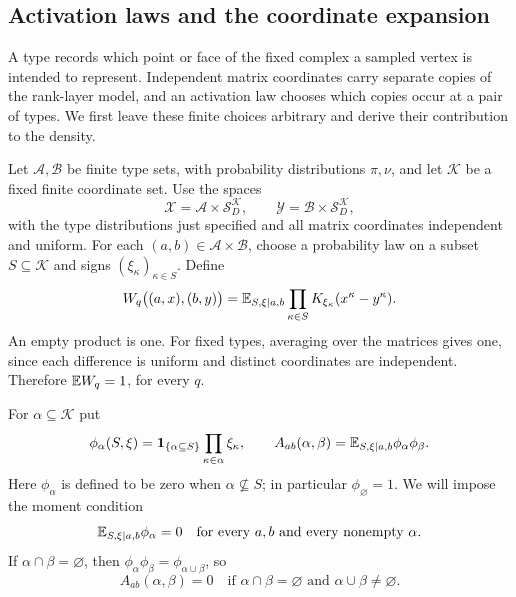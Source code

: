 \subsection{Activation laws and the coordinate expansion}

A type records which point or face of the fixed complex a sampled
vertex is intended to represent. Independent matrix coordinates carry
separate copies of the rank-layer model, and an activation law chooses
which copies occur at a pair of types. We first leave these finite
choices arbitrary and derive their contribution to the density.

Let $\mathcal A,\mathcal B$ be finite type sets, with probability
distributions $\pi,\nu$, and let $\mathcal K$ be a fixed finite
coordinate set. Use the spaces
\[
 \mathcal X=\mathcal A\times\mathcal S_D^{\mathcal K},\qquad
 \mathcal Y=\mathcal B\times\mathcal S_D^{\mathcal K},
\]
with the type distributions just specified and all matrix coordinates
independent and uniform. For each $(a,b)\in\mathcal A\times\mathcal B$,
choose a probability law on a subset $S\subseteq\mathcal K$ and signs
$(\xi_\kappa)_{\kappa\in S}$. Define
\begin{equation}
 W_q\bigl((a,x),(b,y)\bigr)
 =\mathbb E_{S,\xi\mid a,b}\prod_{\kappa\in S}
 K_{\xi_\kappa}(x^\kappa-y^\kappa).
 \label{eq:kernel-activation}
\end{equation}
An empty product is one. For fixed types, averaging over the matrices
gives one, since each difference is uniform and distinct coordinates
are independent. Therefore $\mathbb E W_q=1$, for every $q$.

For $\alpha\subseteq\mathcal K$ put
\[
 \phi_\alpha(S,\xi)=
 \mathbf 1_{\{\alpha\subseteq S\}}\prod_{\kappa\in\alpha}\xi_\kappa,
 \qquad
 A_{ab}(\alpha,\beta)=\mathbb E_{S,\xi\mid a,b}\phi_\alpha\phi_\beta.
\]
Here $\phi_\alpha$ is defined to be zero when $\alpha\not\subseteq S$;
in particular $\phi_\varnothing=1$. We will impose the moment condition
\begin{equation}
 \mathbb E_{S,\xi\mid a,b}\phi_\alpha=0
 \quad\text{for every $a,b$ and every nonempty $\alpha$.}
 \label{eq:kernel-zero-moments}
\end{equation}
If $\alpha\cap\beta=\varnothing$, then
$\phi_\alpha\phi_\beta=\phi_{\alpha\cup\beta}$, so
\begin{equation}
 A_{ab}(\alpha,\beta)=0
 \quad\text{if $\alpha\cap\beta=\varnothing$ and
 $\alpha\cup\beta\ne\varnothing$.}
 \label{eq:kernel-disjoint-zero}
\end{equation}

